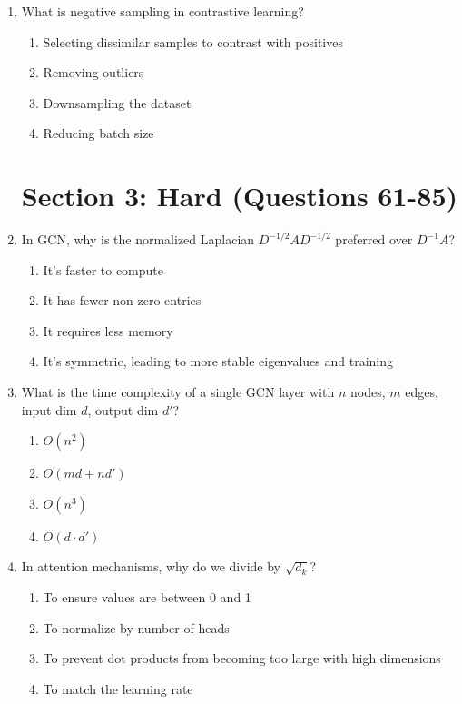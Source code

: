 \documentclass[12pt,a4paper]{article}
\begin{document}
\begin{enumerate}
\item What is negative sampling in contrastive learning?
\begin{enumerate}[label=\Alph*)]
    \item Selecting dissimilar samples to contrast with positives
    \item Removing outliers
    \item Downsampling the dataset
    \item Reducing batch size
\end{enumerate}

\newpage
\section*{\textcolor{hard}{Section 3: Hard (Questions 61-85)}}

\item In GCN, why is the normalized Laplacian $D^{-1/2}AD^{-1/2}$ preferred over $D^{-1}A$?
\begin{enumerate}[label=\Alph*)]
    \item It's faster to compute
    \item It has fewer non-zero entries
    \item It requires less memory
    \item It's symmetric, leading to more stable eigenvalues and training
\end{enumerate}

\item What is the time complexity of a single GCN layer with $n$ nodes, $m$ edges, input dim $d$, output dim $d'$?
\begin{enumerate}[label=\Alph*)]
    \item $O(n^2)$
    \item $O(md + nd')$
    \item $O(n^3)$
    \item $O(d \cdot d')$
\end{enumerate}

\item In attention mechanisms, why do we divide by $\sqrt{d_k}$?
\begin{enumerate}[label=\Alph*)]
    \item To ensure values are between 0 and 1
    \item To normalize by number of heads
    \item To prevent dot products from becoming too large with high dimensions
    \item To match the learning rate
\end{enumerate}


\end{enumerate}
\end{document}
